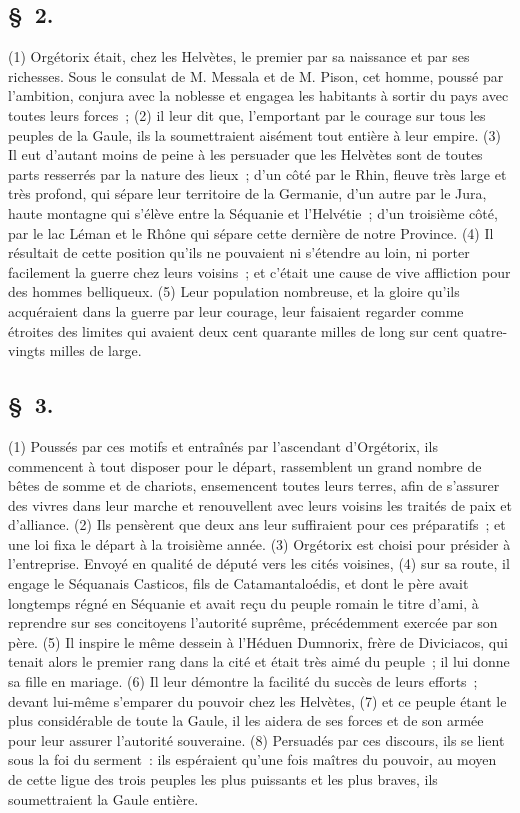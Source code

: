 \documentclass[french,twoside]{book} %
\begin{document}
\subsection[{§ 2.}]{ \textsc{§ 2.} }
\noindent (1) Orgétorix était, chez les Helvètes, le premier par sa naissance et par ses richesses. Sous le consulat de M. Messala et de M. Pison, cet homme, poussé par l’ambition, conjura avec la noblesse et engagea les habitants à sortir du pays avec toutes leurs forces ; (2) il leur dit que, l’emportant par le courage sur tous les peuples de la Gaule, ils la soumettraient aisément tout entière à leur empire. (3) Il eut d’autant moins de peine à les persuader que les Helvètes sont de toutes parts resserrés par la nature des lieux ; d’un côté par le Rhin, fleuve très large et très profond, qui sépare leur territoire de la Germanie, d’un autre par le Jura, haute montagne qui s’élève entre la Séquanie et l’Helvétie ; d’un troisième côté, par le lac Léman et le Rhône qui sépare cette dernière de notre Province. (4) Il résultait de cette position qu’ils ne pouvaient ni s’étendre au loin, ni porter facilement la guerre chez leurs voisins ; et c’était une cause de vive affliction pour des hommes belliqueux. (5) Leur population nombreuse, et la gloire qu’ils acquéraient dans la guerre par leur courage, leur faisaient regarder comme étroites des limites qui avaient deux cent quarante milles de long sur cent quatre-vingts milles de large.
\subsection[{§ 3.}]{ \textsc{§ 3.} }
\noindent (1) Poussés par ces motifs et entraînés par l’ascendant d’Orgétorix, ils commencent à tout disposer pour le départ, rassemblent un grand nombre de bêtes de somme et de chariots, ensemencent toutes leurs terres, afin de s’assurer des vivres dans leur marche et renouvellent avec leurs voisins les traités de paix et d’alliance. (2) Ils pensèrent que deux ans leur suffiraient pour ces préparatifs ; et une loi fixa le départ à la troisième année. (3) Orgétorix est choisi pour présider à l’entreprise. Envoyé en qualité de député vers les cités voisines, (4) sur sa route, il engage le Séquanais Casticos, fils de Catamantaloédis, et dont le père avait longtemps régné en Séquanie et avait reçu du peuple romain le titre d’ami, à reprendre sur ses concitoyens l’autorité suprême, précédemment exercée par son père. (5) Il inspire le même dessein à l’Héduen Dumnorix, frère de Diviciacos, qui tenait alors le premier rang dans la cité et était très aimé du peuple ; il lui donne sa fille en mariage. (6) Il leur démontre la facilité du succès de leurs efforts ; devant lui-même s’emparer du pouvoir chez les Helvètes, (7) et ce peuple étant le plus considérable de toute la Gaule, il les aidera de ses forces et de son armée pour leur assurer l’autorité souveraine. (8) Persuadés par ces discours, ils se lient sous la foi du serment : ils espéraient qu’une fois maîtres du pouvoir, au moyen de cette ligue des trois peuples les plus puissants et les plus braves, ils soumettraient la Gaule entière.
\end{document}
